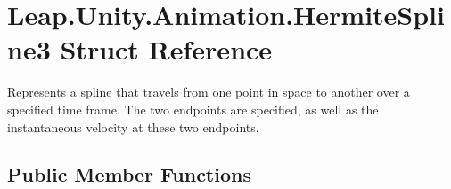 \hypertarget{struct_leap_1_1_unity_1_1_animation_1_1_hermite_spline3}{}\section{Leap.\+Unity.\+Animation.\+Hermite\+Spline3 Struct Reference}
\label{struct_leap_1_1_unity_1_1_animation_1_1_hermite_spline3}


Represents a spline that travels from one point in space to another over a specified time frame. The two endpoints are specified, as well as the instantaneous velocity at these two endpoints.  


\subsection*{Public Member Functions}
